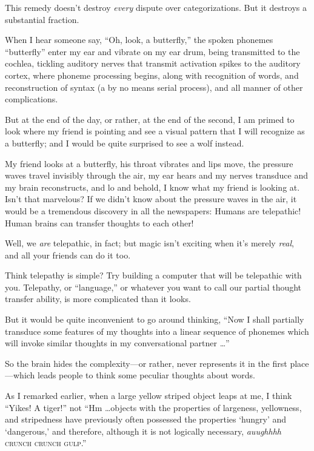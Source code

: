 {
 This remedy doesn't destroy \textit{every} dispute
over categorizations. But it destroys a substantial fraction.}

\myendsectiontext


{
 When I hear someone say, ``Oh, look, a
butterfly,'' the spoken phonemes
``butterfly'' enter my ear and
vibrate on my ear drum, being transmitted to the cochlea, tickling
auditory nerves that transmit activation spikes to the auditory cortex,
where phoneme processing begins, along with recognition of words, and
reconstruction of syntax (a by no means serial process), and all manner
of other complications. }

{
 But at the end of the day, or rather, at the end of the second, I
am primed to look where my friend is pointing and see a visual pattern
that I will recognize as a butterfly; and I would be quite surprised to
see a wolf instead.}

{
 My friend looks at a butterfly, his throat vibrates and lips move,
the pressure waves travel invisibly through the air, my ear hears and
my nerves transduce and my brain reconstructs, and lo and behold, I
know what my friend is looking at. Isn't that
marvelous? If we didn't know about the pressure waves
in the air, it would be a tremendous discovery in all the newspapers:
Humans are telepathic! Human brains can transfer thoughts to each
other!}

{
 Well, we \textit{are} telepathic, in fact; but magic
isn't exciting when it's merely
\textit{real}, and all your friends can do it too.}

{
 Think telepathy is simple? Try building a computer that will be
telepathic with you. Telepathy, or
``language,'' or whatever you want
to call our partial thought transfer ability, is more complicated than
it looks.}

{
 But it would be quite inconvenient to go around thinking,
``Now I shall partially transduce some features of my
thoughts into a linear sequence of phonemes which will invoke similar
thoughts in my conversational partner \ldots''}

{
 So the brain hides the complexity---or rather, never represents it
in the first place---which leads people to think some peculiar thoughts
about words.}

{
 As I remarked earlier, when a large yellow striped object leaps at
me, I think ``Yikes! A tiger!'' not
``Hm \ldots objects with the properties of largeness,
yellowness, and stripedness have previously often possessed the
properties `hungry' and
`dangerous,' and therefore, although it
is not logically necessary, \textit{auughhhh} \textsc{crunch crunch
gulp}.''}

